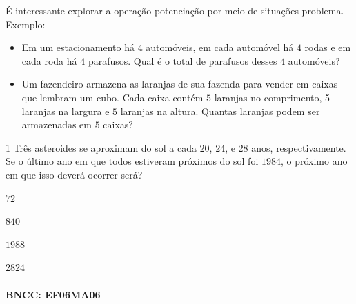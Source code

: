 {\noindent É interessante explorar a operação potenciação por meio de
situações-problema. Exemplo:

\begin{itemize}
\item Em um estacionamento há $4$ automóveis, em cada automóvel há $4$ rodas e
em cada roda há $4$ parafusos. Qual é o total de parafusos desses $4$
automóveis?

\item Um fazendeiro armazena as laranjas de sua fazenda para vender em
caixas que lembram um cubo. Cada caixa contém $5$ laranjas no comprimento,
5 laranjas na largura e $5$ laranjas na altura. Quantas laranjas podem ser
armazenadas em $5$ caixas?
\end{itemize}




\num{1}  Três asteroides se aproximam do sol a cada $20$, $24$, e $28$ anos,
respectivamente. Se o último ano em que todos estiveram próximos do sol
foi $1984$, o próximo ano em que isso deverá ocorrer será?

\begin{escolha}
\item
  $72$
\item
  $840$
\item
  $1988$
\item
  $2824$
\end{escolha}

\paragraph{BNCC: EF06MA06 }

}
